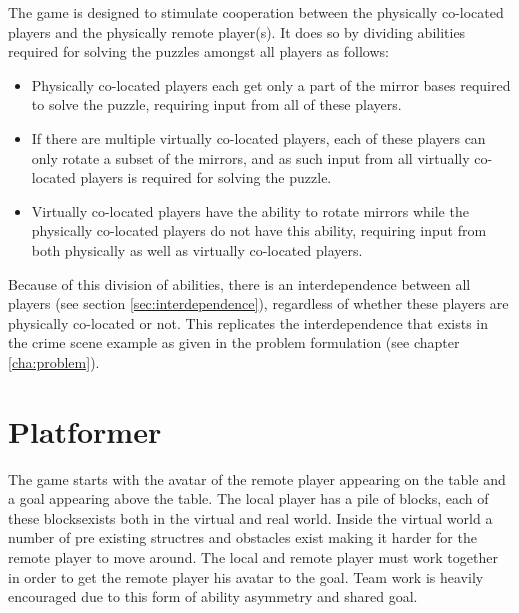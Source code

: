 	The game is designed to stimulate cooperation between the physically 
	co-located players and the physically remote player(s). It does so by 
	dividing abilities required for solving the puzzles amongst all players 
	as follows:
	
	\begin{itemize}
		\item Physically co-located players each get only a part of the 
		      mirror bases required to solve the puzzle, requiring input 
		      from all of these players.
		\item If there are multiple virtually co-located players, each of 
		      these players can only rotate a subset of the mirrors, and 
		      as such input from all virtually co-located players is 
		      required for solving the puzzle. 
		\item Virtually co-located players have the ability to rotate 
		      mirrors while the physically co-located players do not have 
		      this ability, requiring input from both physically as well
		      as virtually co-located players.
	\end{itemize}

	Because of this division of abilities, there is an interdependence 
	between all players (see section \ref{sec:interdependence}), regardless of
	whether these players are physically co-located or not. This replicates the 
	interdependence that exists in the crime scene example as given in the 
	problem formulation (see chapter \ref{cha:problem}).

\section{Platformer}{}
The game starts with the avatar of the remote player appearing
 on the table and a goal appearing above the table. The local
  player has a pile of blocks, each of these blocksexists both
   in the virtual and real world. 
Inside the virtual world a number of pre existing structres and
 obstacles exist making it harder for the remote player to move around. 
The local and remote player must work together in order to get the
 remote player his avatar to the goal. 
Team work is heavily encouraged due to this form of ability 
asymmetry and shared goal.  

